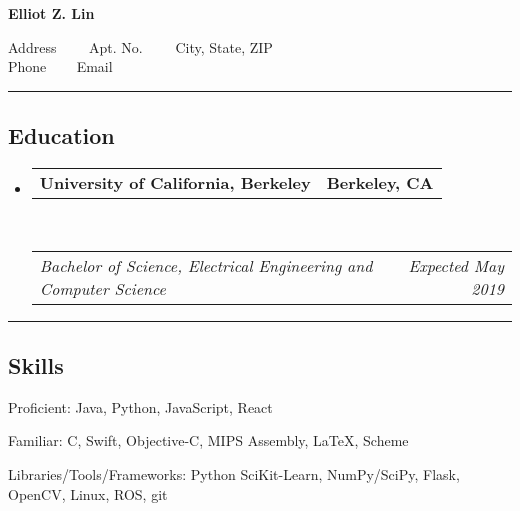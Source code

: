 \documentclass[10pt,letterpaper]{article}
\makeatletter
\newenvironment{indentsection}[1]%
{\begin{list}{}%
	{\setlength{\leftmargin}{#1}}%
	\item[]%
}
{\end{list}}
\newcommand{\headerrow}[2]
{\begin{tabular*}{\linewidth}{l@{\extracolsep{\fill}}r}
	#1 &
	#2 \\
\end{tabular*}}
\newcommand{\CPP}
{C\nolinebreak[4]\hspace{-.05em}\raisebox{.22ex}{\footnotesize\bf ++}}
\makeatother
\begin{document}
\begin{center}
{\LARGE \textbf{Elliot Z. Lin}}

Address\ \ \textbullet
\ \ Apt. No.\ \ \textbullet
\ \ City, State, ZIP
\\
Phone \ \textbullet
\ \ Email
\end{center}

\hrule
\vspace{-0.4em}
\subsection*{Education}

\begin{itemize}
	\parskip=0.1em

	\item 
	\headerrow
		{\textbf{University of California, Berkeley}}
		{\textbf{Berkeley, CA}}
	\\
	\headerrow
		{\emph{Bachelor of Science, Electrical Engineering and Computer Science}}
		{\emph{Expected May 2019}}

\end{itemize}


\hrule
\vspace{-0.4em}
\subsection*{Skills}

\begin{indentsection}{\parindent}
\begin{description*}
	\item[Proficient:]
	Java, Python, JavaScript, React
	\item[Familiar:]
	\CPP, Swift, Objective-C, MIPS Assembly, \LaTeX, Scheme
	\item[Libraries/Tools/Frameworks:]
	Python SciKit-Learn, NumPy/SciPy, Flask, OpenCV, Linux, ROS, git
\end{description*}
\end{indentsection}
\end{document}
